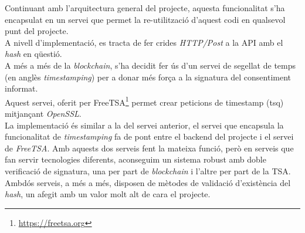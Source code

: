 \newline Continuant amb l'arquitectura general del projecte, aquesta funcionalitat s'ha encapsulat en un servei que permet la re-utilització d'aquest codi en qualsevol punt del projecte.\\
A nivell d'implementació, es tracta de fer crides \textit{HTTP/Post} a la API amb el \textit{hash} en qüestió.\\
\newline A més a més de la \textit{blockchain}, s'ha decidit fer ús d'un servei de segellat de temps (en anglès \textit{timestamping}) per a donar més força a la signatura del consentiment informat.\\
Aquest servei, oferit per FreeTSA\footnote{\url{https://freetsa.org}} permet crear peticions de timestamp (tsq) mitjançant \textit{OpenSSL}.\\
\newline La implementació és similar a la del servei anterior, el servei que encapsula la funcionalitat de \textit{timestamping} fa de pont entre el backend del projecte i el servei de \textit{FreeTSA}.
\newline Amb aquests dos serveis fent la mateixa funció, però en serveis que fan servir tecnologies diferents, aconseguim un sistema robust amb doble verificació de signatura, una per part de \textit{blockchain} i l'altre per part de la TSA.\\
Ambdós serveis, a més a més, disposen de mètodes de validació d'existència del \textit{hash}, un afegit amb un valor molt alt de cara el projecte.
\clearpage

